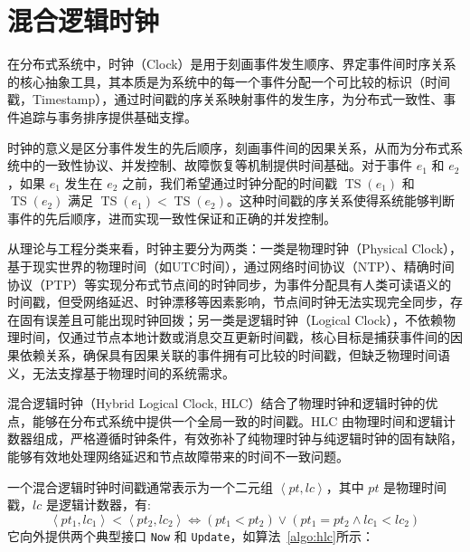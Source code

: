 \section{混合逻辑时钟}
在分布式系统中，时钟（Clock）是用于刻画事件发生顺序、界定事件间时序关系的核心抽象工具，其本质是为系统中的每一个事件分配一个可比较的标识（时间戳，Timestamp），通过时间戳的序关系映射事件的发生序，为分布式一致性、事件追踪与事务排序提供基础支撑。

时钟的意义是区分事件发生的先后顺序，刻画事件间的因果关系，从而为分布式系统中的一致性协议、并发控制、故障恢复等机制提供时间基础。对于事件 $e_1$ 和 $e_2$，如果 $e_1$ 发生在 $e_2$ 之前，我们希望通过时钟分配的时间戳 $\operatorname{TS}(e_1)$ 和 $\operatorname{TS}(e_2)$ 满足 $\operatorname{TS}(e_1) < \operatorname{TS}(e_2)$。这种时间戳的序关系使得系统能够判断事件的先后顺序，进而实现一致性保证和正确的并发控制。

从理论与工程分类来看，时钟主要分为两类：一类是物理时钟（Physical Clock），基于现实世界的物理时间（如UTC时间），通过网络时间协议（NTP）、精确时间协议（PTP）等实现分布式节点间的时钟同步，为事件分配具有人类可读语义的时间戳，但受网络延迟、时钟漂移等因素影响，节点间时钟无法实现完全同步，存在固有误差且可能出现时钟回拨；另一类是逻辑时钟（Logical Clock），不依赖物理时间，仅通过节点本地计数或消息交互更新时间戳，核心目标是捕获事件间的因果依赖关系，确保具有因果关联的事件拥有可比较的时间戳，但缺乏物理时间语义，无法支撑基于物理时间的系统需求。

混合逻辑时钟（Hybrid Logical Clock, HLC）\cite{kulkarni2014logical}结合了物理时钟和逻辑时钟的优点，能够在分布式系统中提供一个全局一致的时间戳。HLC 由物理时间和逻辑计数器组成，严格遵循时钟条件，有效弥补了纯物理时钟与纯逻辑时钟的固有缺陷，能够有效地处理网络延迟和节点故障带来的时间不一致问题。

一个混合逻辑时钟时间戳通常表示为一个二元组 $\left \langle pt, lc \right \rangle$，其中 $pt$ 是物理时间戳，$lc$ 是逻辑计数器，有:
\begin{equation}
  \left \langle pt_1, lc_1 \right \rangle < \left \langle pt_2, lc_2 \right \rangle \iff (pt_1 < pt_2) \lor (pt_1 = pt_2 \land lc_1 < lc_2)
\end{equation}
它向外提供两个典型接口 \lstinline|Now| 和 \lstinline|Update|，如算法~\ref{algo:hlc}所示：

